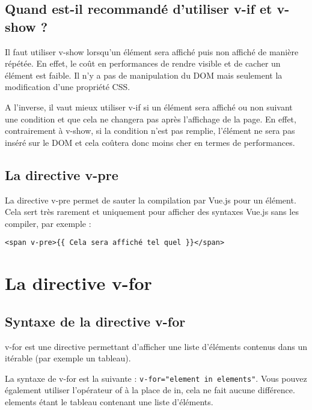 \subsection{Quand est-il recommandé d'utiliser {\color{monOrange}v-if} et {\color{monOrange}v-show} ?}
Il faut utiliser {\color{monOrange}v-show} lorsqu'un élément sera affiché puis non affiché de manière répétée. En effet, le coût en performances de rendre visible et de cacher un élément est faible. Il n'y a pas de manipulation du DOM mais seulement la modification d'une propriété CSS.

A l'inverse, il vaut mieux utiliser {\color{monOrange}v-if} si un élément sera affiché ou non suivant une condition et que cela ne changera pas après l'affichage de la page. En effet, contrairement à v-show, si la condition n'est pas remplie, l'élément ne sera pas inséré sur le DOM et cela coûtera donc moins cher en termes de performances.

\subsection{La directive {\color{monOrange}v-pre}}
La directive {\color{monOrange}v-pre} permet de sauter la compilation par {\color{monOrange}Vue.js} pour un élément. Cela sert très rarement et uniquement pour afficher des syntaxes {\color{monOrange}Vue.js} sans les compiler, par exemple :
\begin{verbatim}
<span v-pre>{{ Cela sera affiché tel quel }}</span>
\end{verbatim}


\section{La directive v-for}
\subsection{Syntaxe de la directive {\color{monOrange}v-for}}
{\color{monOrange}v-for} est une directive permettant d'afficher une liste d'éléments contenus dans un itérable (par exemple un tableau).

La syntaxe de {\color{monOrange}v-for} est la suivante : {\tt v-for="element in elements"}. Vous pouvez également utiliser l'opérateur {\color{monOrange}of} à la place de {\color{monOrange}in}, cela ne fait aucune différence. {\color{monOrange}elements} étant le tableau contenant une liste d'éléments.

